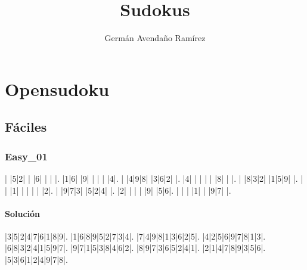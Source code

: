 \documentclass[10pt,a4paper]{article}
\author{Germán Avendaño Ramírez}
\title{Sudokus}
\begin{document}
\section*{Opensudoku}
\subsection*{F\'{a}ciles}
\subsubsection*{Easy_01}
\begin{sudoku}
| |5|2| | |6| | | |.
|1|6| |9| | | | |4|.
| |4|9|8| |3|6|2| |.
|4| | | | | |8| | |.
| |8|3|2| |1|5|9| |.
| | |1| | | | | |2|.
| |9|7|3| |5|2|4| |.
|2| | | | |9| |5|6|.
| | | |1| | |9|7| |.
\end{sudoku}

\renewcommand*\sudokuformat[1]{\sffamily#1}
\setlength\sudokusize{5cm}
\paragraph*{Solución}


\begin{sudoku}
|3|5|2|4|7|6|1|8|9|.
|1|6|8|9|5|2|7|3|4|.
|7|4|9|8|1|3|6|2|5|.
|4|2|5|6|9|7|8|1|3|.
|6|8|3|2|4|1|5|9|7|.
|9|7|1|5|3|8|4|6|2|.
|8|9|7|3|6|5|2|4|1|.
|2|1|4|7|8|9|3|5|6|.
|5|3|6|1|2|4|9|7|8|.
\end{sudoku}
\end{document}
